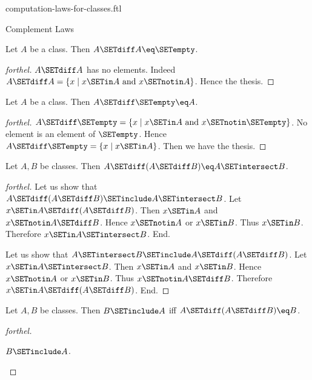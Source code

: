 \documentclass{stex}
\begin{document}
\begin{smodule}{computation-laws-for-classes.ftl}
\begin{sfragment}{Complement Laws}
  \begin{proposition}[forthel,id=FOUNDATIONS_02_7433299337150464]
    Let $A$ be a class.
    Then $A \SETdiff A \eq \SETempty$.
  \end{proposition}
  \begin{proof}[forthel]
    $A \SETdiff A$ has no elements.
    Indeed $A \SETdiff A = \{ x \mid x \SETin A\text{ and }x \SETnotin A \}$.
    Hence the thesis.
  \end{proof}

  \begin{proposition}[forthel,id=FOUNDATIONS_02_3783696985358336]
    Let $A$ be a class.
    Then $A \SETdiff \SETempty \eq A$.
  \end{proposition}
  \begin{proof}[forthel]
    $A \SETdiff \SETempty = \{ x \mid x \SETin A\text{ and }x \SETnotin \SETempty \}$.
    No element is an element of $\SETempty$.
    Hence $A \SETdiff \SETempty = \{ x \mid x \SETin A \}$.
    Then we have the thesis.
  \end{proof}

  \begin{proposition}[forthel,id=FOUNDATIONS_02_7083929257377792]
    Let $A, B$ be classes.
    Then $A \SETdiff (A \SETdiff B) \eq A \SETintersect B$.
  \end{proposition}
  \begin{proof}[forthel]
    Let us show that $A \SETdiff (A \SETdiff B) \SETinclude A \SETintersect B$.
      Let $x \SETin A \SETdiff (A \SETdiff B)$.
      Then $x \SETin A$ and $x \SETnotin A \SETdiff B$.
      Hence $x \SETnotin A$ or $x \SETin B$.
      Thus $x \SETin B$.
      Therefore $x \SETin A \SETintersect B$.
    End.

    Let us show that $A \SETintersect B \SETinclude A \SETdiff (A \SETdiff B)$.
      Let $x \SETin A \SETintersect B$.
      Then $x \SETin A$ and $x \SETin B$.
      Hence $x \SETnotin A$ or $x \SETin B$.
      Thus $x \SETnotin A \SETdiff B$.
      Therefore $x \SETin A \SETdiff (A \SETdiff B)$.
    End.
  \end{proof}

  \begin{proposition}[forthel,id=FOUNDATIONS_02_4938646769631232]
    Let $A, B$ be classes.
    Then $B \SETinclude A$ iff $A \SETdiff (A \SETdiff B) \eq B$.
  \end{proposition}
  \begin{proof}[forthel]
    \begin{case}{$B \SETinclude A$.} \end{case}


\end{proof}
\end{sfragment}
\end{smodule}
\end{document}
